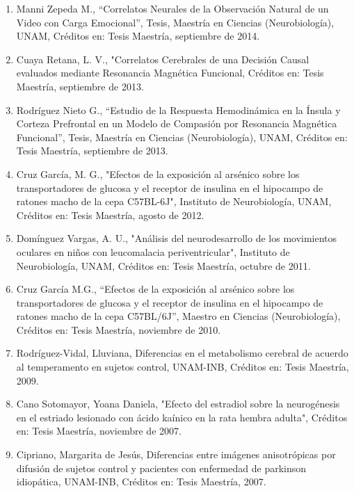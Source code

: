 \documentclass[12pt]{article}
\begin{document}
\begin{enumerate}
\item Manni Zepeda M., “Correlatos Neurales de la Observación Natural de un Video con Carga Emocional”, Tesis, Maestría en Ciencias 
(Neurobiología), UNAM, Créditos en: Tesis Maestría, septiembre de 2014.

\item Cuaya Retana, L. V., "Correlatos Cerebrales de una Decisión Causal evaluados mediante Resonancia Magnética Funcional, Créditos 
en: 
Tesis Maestría, septiembre de 2013.

\item Rodríguez Nieto G., “Estudio de la Respuesta Hemodinámica en la Ínsula y Corteza Prefrontal en un Modelo de Compasión por 
Resonancia Magnética Funcional”, Tesis, Maestría en Ciencias (Neurobiología), UNAM, Créditos en: Tesis Maestría, septiembre de 2013.

\item Cruz García, M. G., "Efectos de la exposición al arsénico sobre los transportadores de glucosa y el receptor de insulina en el 
hipocampo de ratones macho de la cepa C57BL-6J", Instituto de Neurobiología, UNAM, Créditos en: Tesis Maestría, agosto de 2012.

\item Domínguez Vargas, A. U., "Análisis del neurodesarrollo de los movimientos oculares en niños con leucomalacia periventricular", 
Instituto de Neurobiología, UNAM, Créditos en: Tesis Maestría, octubre de 2011.

\item Cruz García M.G., “Efectos de la exposición al arsénico sobre los transportadores de glucosa y el receptor de insulina en el 
hipocampo de ratones macho de la cepa C57BL/6J”, Maestro en Ciencias (Neurobiología), Créditos en: Tesis Maestría, noviembre de 2010.

\item Rodríguez-Vidal, Lluviana, Diferencias en el metabolismo cerebral de acuerdo al temperamento en sujetos control, 
UNAM-INB, Créditos en: Tesis Maestría, 2009.

\item Cano Sotomayor, Yoana Daniela, "Efecto del estradiol sobre la neurogénesis en el estriado lesionado con ácido kaínico en la rata 
hembra adulta", Créditos en: Tesis Maestría, noviembre de 2007.

\item Cipriano, Margarita de Jesús, Diferencias entre imágenes anisotrópicas por difusión de sujetos control y pacientes con enfermedad 
de parkinson idiopática, UNAM-INB, Créditos en: Tesis Maestría, 2007.


\end{enumerate}
\end{document}
